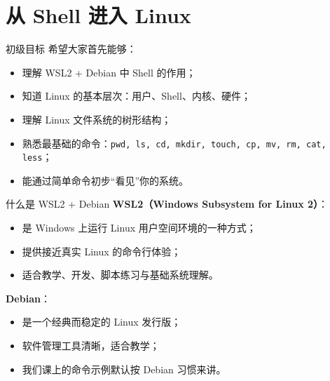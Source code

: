 \documentclass[aspectratio=169]{beamer}
\begin{document}
\section{从 Shell 进入 Linux}

\begin{frame}{初级目标}
希望大家首先能够：
\begin{itemize}
  \item 理解 WSL2 + Debian 中 Shell 的作用；
  \item 知道 Linux 的基本层次：用户、Shell、内核、硬件；
  \item 理解 Linux 文件系统的树形结构；
  \item 熟悉最基础的命令：\texttt{pwd, ls, cd, mkdir, touch, cp, mv, rm, cat, less}；
  \item 能通过简单命令初步“看见”你的系统。
\end{itemize}
\end{frame}

\begin{frame}{什么是 WSL2 + Debian}
\textbf{WSL2（Windows Subsystem for Linux 2）}：
\begin{itemize}
  \item 是 Windows 上运行 Linux 用户空间环境的一种方式；
  \item 提供接近真实 Linux 的命令行体验；
  \item 适合教学、开发、脚本练习与基础系统理解。
\end{itemize}

\vspace{0.5em}
\textbf{Debian}：
\begin{itemize}
  \item 是一个经典而稳定的 Linux 发行版；
  \item 软件管理工具清晰，适合教学；
  \item 我们课上的命令示例默认按 Debian 习惯来讲。
\end{itemize}
\end{frame}
\end{document}
